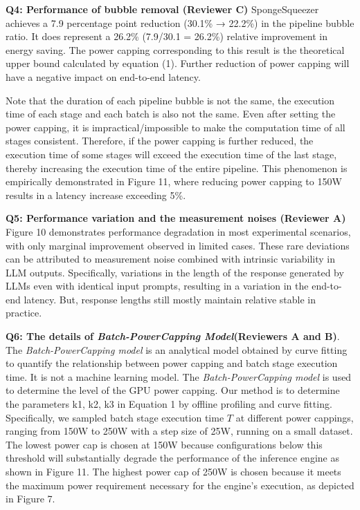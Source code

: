 \textbf{Q4: Performance of bubble removal (Reviewer C)}
SpongeSqueezer achieves a 7.9 percentage point reduction (30.1\% → 22.2\%) in the pipeline bubble ratio.  
It does represent a 26.2\% (7.9/30.1 = 26.2\%) relative improvement in energy saving.
The power capping corresponding to this result is the theoretical upper bound calculated by equation (1). 
Further reduction of power capping will have a negative impact on end-to-end latency. 

Note that the duration of each pipeline bubble is not the same, the execution time of each stage and each batch is also not the same.
Even after setting the power capping, it is impractical/impossible to make the computation time of all stages consistent.
Therefore, if the power capping is further reduced, the execution time of some stages will exceed the execution time of the last stage, thereby increasing the execution time of the entire pipeline.
This phenomenon is empirically demonstrated in Figure 11, where reducing power capping to 150W results in a latency increase exceeding 5\%.


\textbf{Q5: Performance variation and the measurement noises (Reviewer A)}
Figure 10 demonstrates performance degradation in most experimental scenarios, with only marginal improvement observed in limited cases.
These rare deviations can be attributed to measurement noise combined with intrinsic variability in LLM outputs.
Specifically, variations in the length of the response generated by LLMs even with identical input prompts, resulting in a variation in the end-to-end latency. 
But, response lengths still mostly maintain relative stable in practice.




\textbf{Q6: The details of \textit{Batch-PowerCapping Model}(Reviewers A and B)}.
The \textit{Batch-PowerCapping model} is an analytical model obtained by curve fitting to quantify the relationship between power capping and batch stage execution time. 
It is not a machine learning model. 
The \textit{Batch-PowerCapping model} is used to determine the level of the GPU power capping.
Our method is to determine the parameters k1, k2, k3 in Equation 1 by offline profiling and curve fitting.
Specifically, we sampled batch stage execution time $T$ at different power cappings, ranging from 150W to 250W with a step size of 25W, running on a small dataset.
The lowest power cap is chosen at 150W because configurations below this threshold will substantially degrade the performance of the inference engine as shown in Figure 11.
The highest power cap of 250W is chosen because it meets the maximum power requirement necessary for the engine's execution, as depicted in Figure 7.

